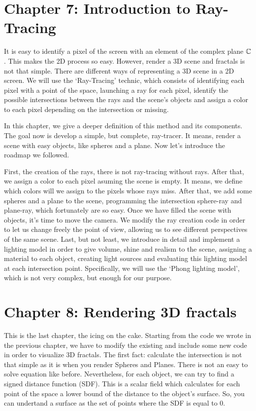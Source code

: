\section*{Chapter 7: Introduction to Ray-Tracing}

It is easy to identify a pixel of the screen with an element of the complex plane $\mathbb{C}$. This makes the 2D process so easy. However, render a 3D scene and fractals is not that simple. There are different ways of representing a 3D scene in a 2D screen. We will use the `Ray-Tracing' technic, which consists of identifying each pixel with a point of the space, launching a ray for each pixel, identify the possible intersections between the rays and the scene's objects and assign a color to each pixel depending on the intersection or missing.

In this chapter, we give a deeper definition of this method and its components. The goal now is develop a simple, but complete, ray-tracer. It means, render a scene with easy objects, like spheres and a plane. Now let's introduce the roadmap we followed.

First, the creation of the rays, there is not ray-tracing without rays. After that, we assign a color to each pixel asuming the scene is empty. It means, we define which colors will we assign to the pixels whose rays miss. After that, we add some spheres and a plane to the scene, programming the intersection sphere-ray and plane-ray, which fortunately are so easy. Once we have filled the scene with objects, it's time to move the camera. We modify the ray creation code in order to let us change freely the point of view, allowing us to see different perspectives of the same scene. Last, but not least, we introduce in detail and implement a lighting model in order to give volume, shine and realism to the scene, assigning a material to each object, creating light sources and evaluating this lighting model at each intersection point. Specifically, we will use the `Phong lighting model', which is not very complex, but enough for our purpose. 

\section*{Chapter 8: Rendering 3D fractals}

This is the last chapter, the icing on the cake. Starting from the code we wrote in the previous chapter, we have to modify the existing and include some new code in order to visualize 3D fractals. The first fact: calculate the intersection is not that simple as it is when you render Spheres and Planes. There is not an easy to solve equation like before. Nevertheless, for each object, we can try to find a signed distance function (SDF). This is a scalar field which calculates for each point of the space a lower bound of the distance to the object's surface. So, you can undertand a surface as the set of points where the SDF is equal to 0.

